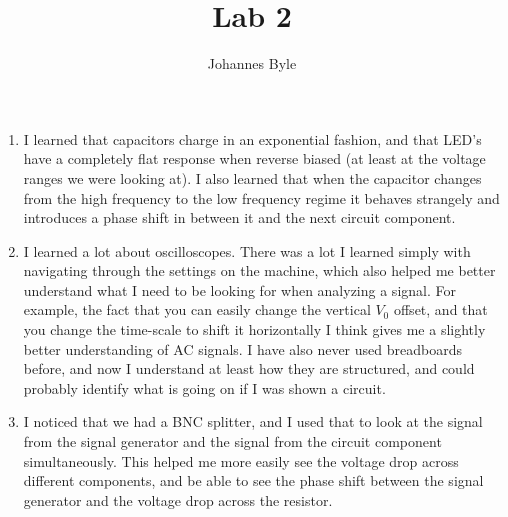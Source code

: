 \documentclass[12pt]{article}
\author{Johannes Byle}
\begin{document}
    \title{Lab 2}
    \maketitle
    \begin{enumerate}
        \item I learned that capacitors charge in an exponential fashion, and that LED's have a completely flat
        response when reverse biased (at least at the voltage ranges we were looking at).
        I also learned that when the capacitor changes from the high frequency to the low frequency regime it behaves
        strangely and introduces a phase shift in between it and the next circuit component.
        \item I learned a lot about oscilloscopes.
        There was a lot I learned simply with navigating through the settings on the machine, which also helped me
        better understand what I need to be looking for when analyzing a signal.
        For example, the fact that you can easily change the vertical $V_0$ offset, and that you change the
        time-scale to shift it horizontally I think gives me a slightly better understanding of AC signals.
        I have also never used breadboards before, and now I understand at least how they are structured, and could
        probably identify what is going on if I was shown a circuit.
        \item I noticed that we had a BNC splitter, and I used that to look at the signal from the signal generator
        and the signal from the circuit component simultaneously.
        This helped me more easily see the voltage drop across different components, and be able to see the phase
        shift between the signal generator and the voltage drop across the resistor.
    \end{enumerate}
\end{document}
